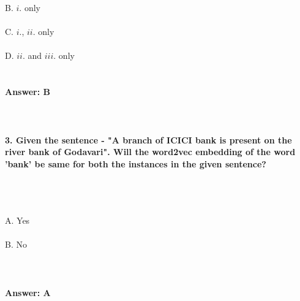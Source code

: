 \documentclass[prl,twocolumn,showpacs,preprintnumbers,superscriptaddress]{revtex4}
\theoremstyle{plain}
\theoremstyle{definition}
\begin{document}
\begin{widetext}
B. $i.$ only 
\\
\\
C. $i.$, $ii.$ only
\\
\\
D. $ii.$ and $iii.$ only
\\
\\
\\
\textbf{Answer: B}
\\
\\
\\
\\
\textbf{3. Given the sentence - "A branch of ICICI bank is present on the river bank of Godavari". Will the word2vec embedding of the word 'bank' be same for both the instances in the given sentence?} 

\\
\\
\\
A. Yes
\\
\\
B. No
\\
\\
\\
\\
\textbf{Answer: A}
\\
\\
\\
\\

\end{widetext}
\end{document}
